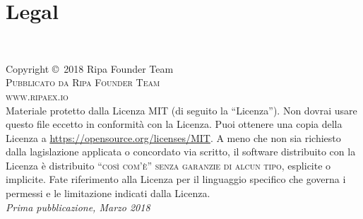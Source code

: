 \documentclass[11pt,fleqn,oneside]{book} %
\begin{document}


\chapter{Legal}



\nocite{*}
\printbibliography[title={References}]



\newpage
~\vfill
\thispagestyle{empty}

\noindent Copyright \copyright\ 2018 Ripa Founder Team\\ %

\noindent \textsc{Pubblicato da Ripa Founder Team}\\ %

\noindent \textsc{www.ripaex.io}\\ %

\noindent Materiale protetto dalla Licenza MIT (di seguito la ``Licenza''). Non dovrai usare questo file eccetto in conformità con la Licenza. Puoi ottenere una copia della Licenza a \url{https://opensource.org/licenses/MIT}. A meno che non sia richiesto dalla lagislazione applicata o concordato via scritto, il software distribuito con la Licenza è distribuito \textsc{``così com'è'' senza garanzie di alcun tipo}, esplicite o implicite. Fate riferimento alla Licenza per il linguaggio specifico che governa i permessi e le limitazione indicati dalla Licenza.\\ 

\noindent \textit{Prima pubblicazione, Marzo 2018} %
\end{document}
